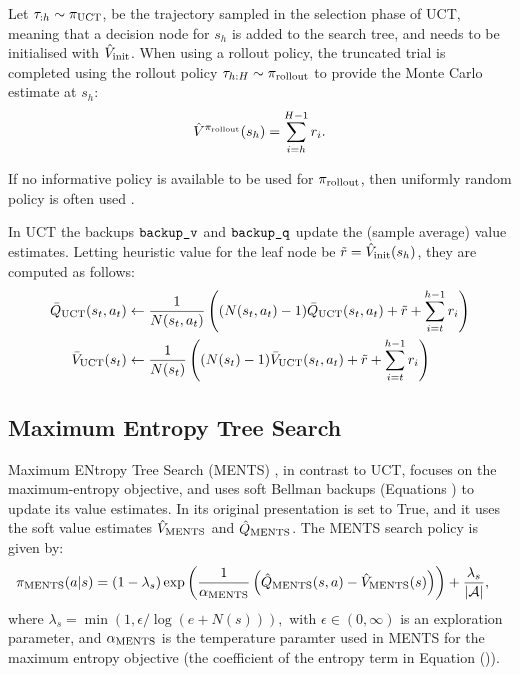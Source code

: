         Let $\tau_{:h}\sim{\pi_{{\textnormal{UCT}}}}$, be the trajectory sampled in the selection phase of UCT, meaning that a decision node for $s_h$ is added to the search tree, and needs to be initialised with ${\hat{V}_{\textnormal{init}}}$. When using a rollout policy, the truncated trial is completed using the rollout policy $\tau_{h:H}\sim{\pi_{{\textnormal{rollout}}}}$ to provide the Monte Carlo estimate at $s_h$:
        \begin{align}
            \hat{V}^{{\pi_{{\textnormal{rollout}}}}}(s_h) = \sum_{i=h}^{H-1} r_i. \label{eq:rollout_value_estimate}
        \end{align}

        If no informative policy is available to be used for ${\pi_{{\textnormal{rollout}}}}$, then uniformly random policy is often used .

        In UCT the backups ${\textnormal{\texttt{backup\_v}}}$ and ${\textnormal{\texttt{backup\_q}}}$ update the (sample average) value estimates. Letting heuristic value for the leaf node be $\tilde{r} = {\hat{V}_{\textnormal{init}}}(s_h)$, they are computed as follows:
        \begin{align}
            {\bar{Q}_{{\textnormal{UCT}}}}(s_t,a_t) &\leftarrow 
                \frac{1}{N(s_t,a_t)} \left( (N(s_t,a_t)-1) {\bar{Q}_{{\textnormal{UCT}}}}(s_t,a_t) 
                    + \tilde{r} + \sum_{i=t}^{h-1} r_i \right) \label{eq:uct_backup_q} \\
            {\bar{V}_{{\textnormal{UCT}}}}(s_t) &\leftarrow 
                \frac{1}{N(s_t)} \left( (N(s_t)-1) {\bar{V}_{{\textnormal{UCT}}}}(s_t,a_t) 
                    + \tilde{r} + \sum_{i=t}^{h-1} r_i \right) \label{eq:uct_backup_v} 
        \end{align}  









    \subsection{Maximum Entropy Tree Search}
    \label{sec:2-4-3-ments}

        Maximum ENtropy Tree Search (MENTS) \cite{ments}, in contrast to UCT, focuses on the maximum-entropy objective, and uses soft Bellman backups (Equations ) to update its value estimates. In its original presentation \mctsmode\ewe is set to True, and it uses the soft value estimates ${\hat{V}_{{\textnormal{MENTS}}}}$ and ${\hat{Q}_{{\textnormal{MENTS}}}}$. The MENTS search policy is given by:
        \begin{align}
            {\pi_{{\textnormal{MENTS}}}}(a|s) &= 
                (1-\lambda_s)\exp\left(\frac{1}{\alpha_{{\textnormal{MENTS}}}}\left({\hat{Q}_{{\textnormal{MENTS}}}}(s,a)-{\hat{V}_{{\textnormal{MENTS}}}}(s)\right)\right) 
                    + \frac{\lambda_s}{|\mathcal{A}|}, \label{eq:ments_policy}
        \end{align}
        where $\lambda_s=\min(1,\epsilon/\log(e+N(s))),$ with $\epsilon \in (0,\infty)$ is an exploration parameter, and $\alpha_{{\textnormal{MENTS}}}$ is the temperature paramter used in MENTS for the maximum entropy objective (the coefficient of the entropy term in Equation ()).

